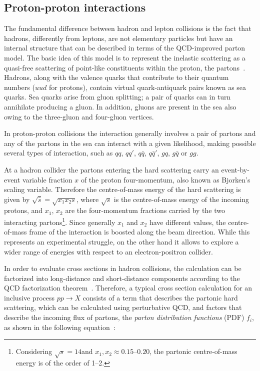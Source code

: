 \subsection{Proton-proton interactions}

The fundamental difference between hadron and lepton collisions is the fact that hadrons, differently from leptons, are not elementary particles but have an internal structure that can be described in terms of the QCD-improved parton model. The basic idea of this model is to represent the inelastic scattering as a quasi-free scattering of point-like constituents within the proton, the partons~\cite{Altarelli:2013tya}. Hadrons, along with the valence quarks that contribute to their quantum numbers ($uud$ for protons), contain virtual quark-antiquark pairs known as sea quarks. Sea quarks arise from gluon splitting; a pair of quarks can in turn annihilate producing a gluon. In addition, gluons are present in the sea also owing to the three-gluon and four-gluon vertices.

In proton-proton collisions the interaction generally involves a pair of partons and any of the partons in the sea can interact with a given likelihood, making possible several types of interaction, such as $qq$, $qq'$, $q\bar{q}$, $q\bar{q}'$, $gq$, $g\bar{q}$ or $gg$.

At a hadron collider the partons entering the hard scattering carry an event-by-event variable fraction $x$ of the proton four-momentum, also known as Bjorken's scaling variable. Therefore the centre-of-mass energy of the hard scattering is given by $\sqrt{\hat{s}} = \sqrt{x_1 x_2 s}$, where $\sqrt{s}$ is the centre-of-mass energy of the incoming protons, and $x_1$, $x_2$ are the four-momentum fractions carried by the two interacting partons\footnote{Considering $\sqrt{s}=14$\TeV and $x_1,x_2 \approx 0.15 \mbox{--} 0.20$, the partonic centre-of-mass energy is of the order of 1--2\TeV.}. Since generally $x_1$ and $x_2$ have different values, the centre-of-mass frame of the interaction is boosted along the beam direction. While this represents an experimental struggle, on the other hand it allows to explore a wider range of energies with respect to an electron-positron collider.

In order to evaluate cross sections in hadron collisions, the calculation can be factorized into long-distance and short-distance components according to the QCD factorization theorem~\cite{Collins:1989gx}. Therefore, a typical cross section calculation for an inclusive process $pp \to X$ consists of a term that describes the partonic hard scattering, which can be calculated using perturbative QCD, and factors that describe the incoming flux of partons, the \emph{parton distribution functions} (PDF) $f_{i}$, as shown in the following equation~\cite{Butterworth:2012fj}:

